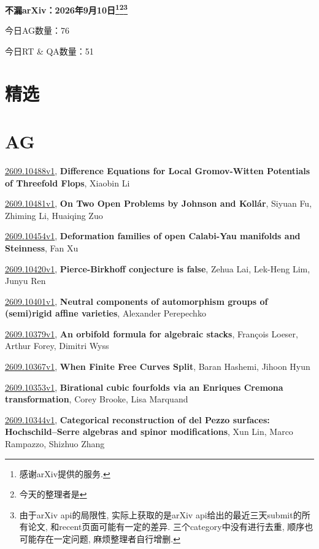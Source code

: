 \documentclass[9pt, a4paper]{article}
\theoremstyle{plain}
\theoremstyle{definition}
\theoremstyle{remark}
\newcommand{\arxiv}[3]{\href{https://arxiv.org/abs/#1}{#1}, \textbf{\textcolor{arxivblue}{#2}}, #3}
\newcommand{\AGnumber}{76}
\newcommand{\RTQAnumber}{51}
\newcommand{\NewestDate}{2026年9月10日}
\newcommand{\todayarXiver}{} %
\begin{document}
\begin{center}
    \Huge\textbf{不漏arXiv：\NewestDate\footnote{感谢arXiv提供的服务.}\footnote{今天的整理者是\todayarXiver}\footnote{由于arXiv api的局限性, 实际上获取的是arXiv api给出的最近三天submit的所有论文, 和recent页面可能有一定的差异. 三个category中没有进行去重, 顺序也可能存在一定问题, 麻烦整理者自行增删.}} \\
\end{center}

\setcounter{section}{-1}

\begin{center}
    今日AG数量：\AGnumber
    
    今日RT \& QA数量：\RTQAnumber
    
\end{center}


\section{精选}


\section{AG}
\arxiv{2609.10488v1}{Difference Equations for Local Gromov-Witten Potentials of Threefold Flops}{Xiaobin Li}

\arxiv{2609.10481v1}{On Two Open Problems by Johnson and Kollár}{Siyuan Fu, Zhiming Li, Huaiqing Zuo}

\arxiv{2609.10454v1}{Deformation families of open Calabi-Yau manifolds and Steinness}{Fan Xu}

\arxiv{2609.10420v1}{Pierce-Birkhoff conjecture is false}{Zehua Lai, Lek-Heng Lim, Junyu Ren}

\arxiv{2609.10401v1}{Neutral components of automorphism groups of (semi)rigid affine varieties}{Alexander Perepechko}

\arxiv{2609.10379v1}{An orbifold formula for algebraic stacks}{François Loeser, Arthur Forey, Dimitri Wyss}

\arxiv{2609.10367v1}{When Finite Free Curves Split}{Baran Hashemi, Jihoon Hyun}

\arxiv{2609.10353v1}{Birational cubic fourfolds via an Enriques Cremona transformation}{Corey Brooke, Lisa Marquand}

\arxiv{2609.10344v1}{Categorical reconstruction of del Pezzo surfaces: Hochschild--Serre algebras and spinor modifications}{Xun Lin, Marco Rampazzo, Shizhuo Zhang}
\end{document}
